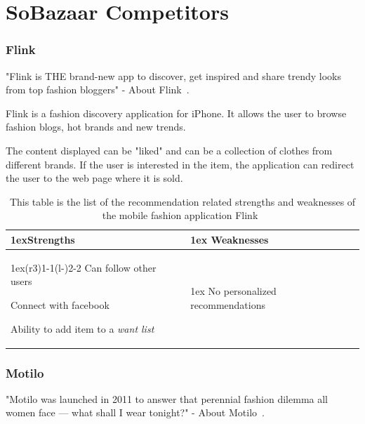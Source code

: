 \section{SoBazaar Competitors}\label{app:sec:soCompetitors}
\subsubsection{Flink} %
\label{par:flink}
    "Flink is THE brand-new app to discover, get inspired and share trendy looks from top fashion bloggers" - About Flink~\cite{flink}.

    Flink is a fashion discovery application for iPhone.
    It allows the user to browse fashion blogs, hot brands and new trends.

    The content displayed can be "liked" and can be a collection of clothes from different brands.
    If the user is interested in the item, the application can redirect the user to the web page where it is sold.
    \begin{table}[H]
            \centering
            \begin{tabularx}{\linewidth}{>{\parskip1ex}X@{\kern4\tabcolsep}>{\parskip1ex}X}
                \toprule
                \hfil\bfseries Strengths
                &
                \hfil\bfseries Weaknesses
                \\\cmidrule(r{3\tabcolsep}){1-1}\cmidrule(l{-\tabcolsep}){2-2}
                Can follow other users \par
                Connect with facebook \par
                Ability to add item to a \emph{want list} \par
                &
                No personalized recommendations \par
                \\\bottomrule
                \end{tabularx}
        \caption[Recommendation related strengths and weaknesses of Flink~\cite{flink}]{This table is the list of the recommendation related strengths and weaknesses of the mobile fashion application Flink~\cite{flink}}
        \label{table:iphoneAppFlink}
    \end{table}

\subsubsection{Motilo} %
\label{par:motilo}
    "Motilo was launched in 2011 to answer that perennial fashion dilemma all women face --- what shall I wear tonight?" - About Motilo~\cite{motilo}.

